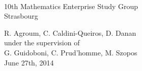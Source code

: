 \begin{frame}[c]


\begin{center}

{\Large{}}\\

\begin{center}
{\large 10th Mathematics Enterprise Study Group\\
Strasbourg}
\end{center}

\bigskip
\textcolor{brunfonce}{R. Agroum, C. Caldini-Queiros, D. Danan \\
under the supervision of\\
G. Guidoboni, C. Prud'homme, M. Szopos}\\
 \bigskip
	\footnotesize\textcolor{brunfonce}{June 27th, 2014}
\end{center}

\end{frame}

%
%
%
%
%
%
